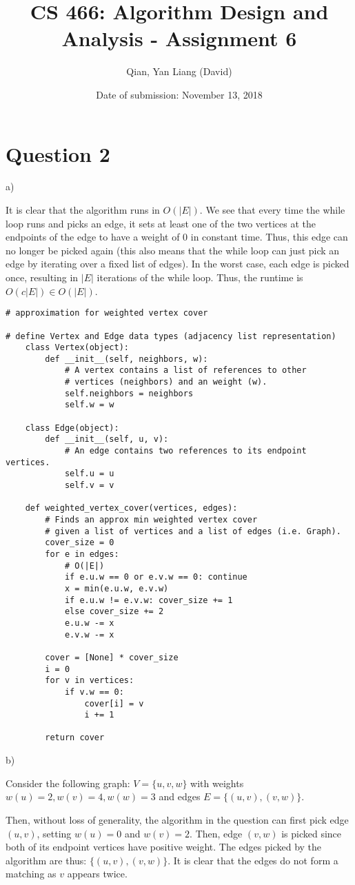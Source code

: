 \documentclass{article}
\title{CS 466: Algorithm Design and Analysis - Assignment 6}
\author{Qian, Yan Liang (David)}
\date{Date of submission: November 13, 2018}
\begin{document}
\newpage

\section{Question 2}

a)

It is clear that the algorithm runs in $O(|E|)$. We see that every time the while loop runs and picks an edge, it sets
at least one of the two vertices at the endpoints of the edge to have a weight of 0 in constant time. Thus, this edge
can no longer be picked again (this also means that the while loop can just pick an edge by iterating over a fixed list
of edges). In the worst case, each edge is picked once, resulting in $|E|$ iterations of the while loop. Thus, the
runtime is $O(c|E|) \in O(|E|)$.

\begin{lstlisting}
# approximation for weighted vertex cover

# define Vertex and Edge data types (adjacency list representation)
    class Vertex(object):
        def __init__(self, neighbors, w):
            # A vertex contains a list of references to other
            # vertices (neighbors) and an weight (w).
            self.neighbors = neighbors
            self.w = w

    class Edge(object):
        def __init__(self, u, v):
            # An edge contains two references to its endpoint vertices.
            self.u = u
            self.v = v

    def weighted_vertex_cover(vertices, edges):
        # Finds an approx min weighted vertex cover
        # given a list of vertices and a list of edges (i.e. Graph).
        cover_size = 0
        for e in edges:
            # O(|E|)
            if e.u.w == 0 or e.v.w == 0: continue
            x = min(e.u.w, e.v.w)
            if e.u.w != e.v.w: cover_size += 1
            else cover_size += 2
            e.u.w -= x
            e.v.w -= x

        cover = [None] * cover_size
        i = 0
        for v in vertices:
            if v.w == 0:
                cover[i] = v
                i += 1

        return cover
\end{lstlisting}


b)

Consider the following graph: $V = \{u, v, w \}$ with weights $w(u) = 2, w(v) = 4, w(w) = 3$ and edges $E = \{(u,
v), (v, w) \}$.

Then, without loss of generality, the algorithm in the question can first pick edge $(u, v)$, setting $w(u) = 0$ and
$w(v) = 2$. Then, edge $(v, w)$ is picked since both of its endpoint vertices have positive weight. The edges picked by
the algorithm are thus: $\{(u, v), (v, w)\}$. It is clear that the edges do not form a matching as $v$ appears twice.
\end{document}
